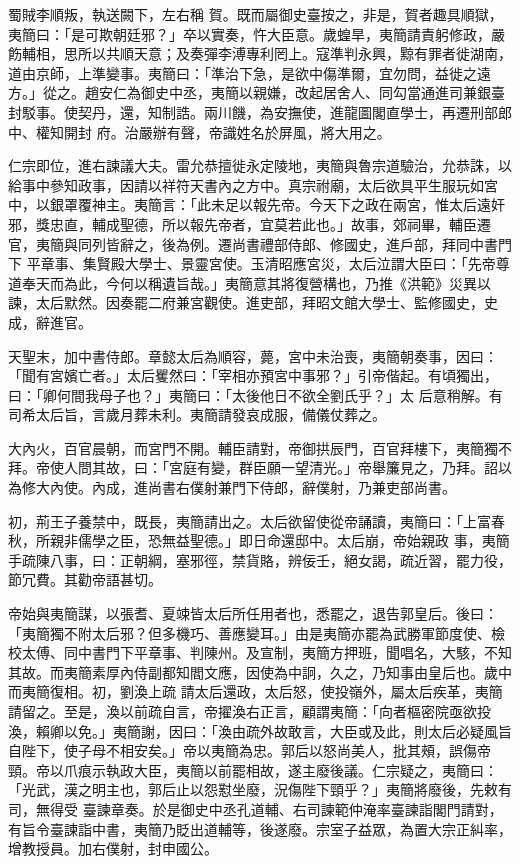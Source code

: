 \begin{pinyinscope}
 蜀賊李順叛，執送闕下，左右稱
 賀。既而屬御史臺按之，非是，賀者趣具順獄，夷簡曰：「是可欺朝廷邪？」卒以實奏，忤大臣意。歲蝗旱，夷簡請責躬修政，嚴飭輔相，思所以共順天意；及奏彈李溥專利罔上。寇準判永興，黥有罪者徙湖南，道由京師，上準變事。夷簡曰：「準治下急，是欲中傷準爾，宜勿問，益徙之遠方。」從之。趙安仁為御史中丞，夷簡以親嫌，改起居舍人、同勾當通進司兼銀臺封駁事。使契丹，還，知制誥。兩川饑，為安撫使，進龍圖閣直學士，再遷刑部郎中、權知開封
 府。治嚴辦有聲，帝識姓名於屏風，將大用之。



 仁宗即位，進右諫議大夫。雷允恭擅徙永定陵地，夷簡與魯宗道驗治，允恭誅，以給事中參知政事，因請以祥符天書內之方中。真宗祔廟，太后欲具平生服玩如宮中，以銀罩覆神主。夷簡言：「此未足以報先帝。今天下之政在兩宮，惟太后遠奸邪，獎忠直，輔成聖德，所以報先帝者，宜莫若此也。」故事，郊祠畢，輔臣遷官，夷簡與同列皆辭之，後為例。遷尚書禮部侍郎、修國史，進戶部，拜同中書門下
 平章事、集賢殿大學士、景靈宮使。玉清昭應宮災，太后泣謂大臣曰：「先帝尊道奉天而為此，今何以稱遺旨哉。」夷簡意其將復營構也，乃推《洪範》災異以諫，太后默然。因奏罷二府兼宮觀使。進吏部，拜昭文館大學士、監修國史，史成，辭進官。



 天聖末，加中書侍郎。章懿太后為順容，薨，宮中未治喪，夷簡朝奏事，因曰：「聞有宮嬪亡者。」太后矍然曰：「宰相亦預宮中事邪？」引帝偕起。有頃獨出，曰：「卿何間我母子也？」夷簡曰：「太後他日不欲全劉氏乎？」太
 后意稍解。有司希太后旨，言歲月葬未利。夷簡請發哀成服，備儀仗葬之。



 大內火，百官晨朝，而宮門不開。輔臣請對，帝御拱辰門，百官拜樓下，夷簡獨不拜。帝使人問其故，曰：「宮庭有變，群臣願一望清光。」帝舉簾見之，乃拜。詔以為修大內使。內成，進尚書右僕射兼門下侍郎，辭僕射，乃兼吏部尚書。



 初，荊王子養禁中，既長，夷簡請出之。太后欲留使從帝誦讀，夷簡曰：「上富春秋，所親非儒學之臣，恐無益聖德。」即日命還邸中。太后崩，帝始親政
 事，夷簡手疏陳八事，曰：正朝綱，塞邪徑，禁貨賂，辨佞壬，絕女謁，疏近習，罷力役，節冗費。其勸帝語甚切。



 帝始與夷簡謀，以張耆、夏竦皆太后所任用者也，悉罷之，退告郭皇后。後曰：「夷簡獨不附太后邪？但多機巧、善應變耳。」由是夷簡亦罷為武勝軍節度使、檢校太傅、同中書門下平章事、判陳州。及宣制，夷簡方押班，聞唱名，大駭，不知其故。而夷簡素厚內侍副都知閻文應，因使為中詗，久之，乃知事由皇后也。歲中而夷簡復相。初，劉渙上疏
 請太后還政，太后怒，使投嶺外，屬太后疾革，夷簡請留之。至是，渙以前疏自言，帝擢渙右正言，顧謂夷簡：「向者樞密院亟欲投渙，賴卿以免。」夷簡謝，因曰：「渙由疏外故敢言，大臣或及此，則太后必疑風旨自陛下，使子母不相安矣。」帝以夷簡為忠。郭后以怒尚美人，批其頰，誤傷帝頸。帝以爪痕示執政大臣，夷簡以前罷相故，遂主廢後議。仁宗疑之，夷簡曰：「光武，漢之明主也，郭后止以怨懟坐廢，況傷陛下頸乎？」夷簡將廢後，先敕有司，無得受
 臺諫章奏。於是御史中丞孔道輔、右司諫範仲淹率臺諫詣閣門請對，有旨令臺諫詣中書，夷簡乃貶出道輔等，後遂廢。宗室子益眾，為置大宗正糾率，增教授員。加右僕射，封申國公。




\end{pinyinscope}
